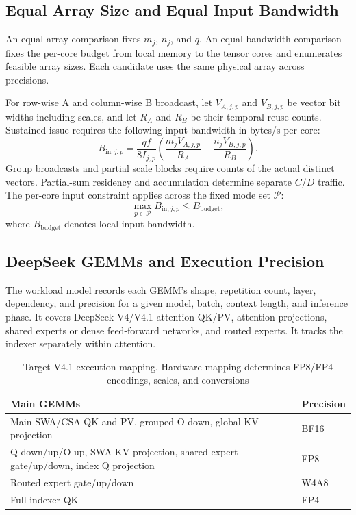\documentclass[conference,9pt,letterpaper]{IEEEtran}
\begin{document}
\subsection{Equal Array Size and Equal Input Bandwidth}
\label{sec:ratio_bandwidth}

An equal-array comparison fixes $m_j$, $n_j$, and $q$. An equal-bandwidth comparison fixes the per-core budget from local memory to the tensor cores and enumerates feasible array sizes. Each candidate uses the same physical array across precisions.

For row-wise A and column-wise B broadcast, let $V_{A,j,p}$ and $V_{B,j,p}$ be vector bit widths including scales, and let $R_A$ and $R_B$ be their temporal reuse counts. Sustained issue requires the following input bandwidth in bytes/s per core:
\begin{equation}
B_{\mathrm{in},j,p}=\frac{qf}{8I_{j,p}}
\left(\frac{m_jV_{A,j,p}}{R_A}+\frac{n_jV_{B,j,p}}{R_B}\right).
\label{eq:ratio_bandwidth}
\end{equation}
Group broadcasts and partial scale blocks require counts of the actual distinct vectors. Partial-sum residency and accumulation determine separate $C/D$ traffic. The per-core input constraint applies across the fixed mode set $\mathcal P$:
\begin{equation}
\max_{p\in\mathcal P}B_{\mathrm{in},j,p}\le B_{\mathrm{budget}},
\label{eq:input_budget}
\end{equation}
where $B_{\mathrm{budget}}$ denotes local input bandwidth.

\subsection{DeepSeek GEMMs and Execution Precision}
\label{sec:workload_extraction}

The workload model records each GEMM's shape, repetition count, layer, dependency, and precision for a given model, batch, context length, and inference phase. It covers DeepSeek-V4/V4.1 attention QK/PV, attention projections, shared experts or dense feed-forward networks, and routed experts. It tracks the indexer separately within attention.

\begin{table}[t]
\centering
\caption{Target V4.1 execution mapping. Hardware mapping determines FP8/FP4 encodings, scales, and conversions}
\label{tab:deepseek_execution_map}
\footnotesize
\begin{tabular}{@{}p{}p{}@{}}\toprule
Main GEMMs & Precision \\\midrule
Main SWA/CSA QK and PV, grouped O-down, global-KV projection & BF16 \\
Q-down/up/O-up, SWA-KV projection, shared expert gate/up/down, index Q projection & FP8 \\
Routed expert gate/up/down & W4A8 \\
Full indexer QK & FP4 \\
\bottomrule\end{tabular}
\end{table}
\end{document}

